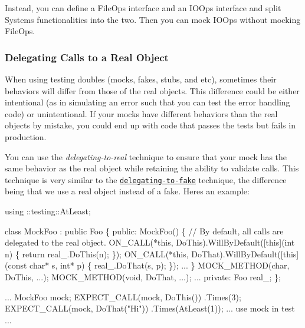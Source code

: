 Instead, you can define a {\ttfamily File\+Ops} interface and an {\ttfamily I\+O\+Ops} interface and split {\ttfamily System}\textquotesingle{}s functionalities into the two. Then you can mock {\ttfamily I\+O\+Ops} without mocking {\ttfamily File\+Ops}.

\subsubsection*{Delegating Calls to a Real Object}

When using testing doubles (mocks, fakes, stubs, and etc), sometimes their behaviors will differ from those of the real objects. This difference could be either intentional (as in simulating an error such that you can test the error handling code) or unintentional. If your mocks have different behaviors than the real objects by mistake, you could end up with code that passes the tests but fails in production.

You can use the {\itshape delegating-\/to-\/real} technique to ensure that your mock has the same behavior as the real object while retaining the ability to validate calls. This technique is very similar to the \href{#DelegatingToFake}{\tt delegating-\/to-\/fake} technique, the difference being that we use a real object instead of a fake. Here\textquotesingle{}s an example\+:


\begin{DoxyCode}
using ::testing::AtLeast;

\textcolor{keyword}{class }MockFoo : \textcolor{keyword}{public} Foo \{
 \textcolor{keyword}{public}:
  MockFoo() \{
    \textcolor{comment}{// By default, all calls are delegated to the real object.}
    ON\_CALL(*\textcolor{keyword}{this}, DoThis).WillByDefault([\textcolor{keyword}{this}](\textcolor{keywordtype}{int} n) \{
      \textcolor{keywordflow}{return} real\_.DoThis(n);
    \});
    ON\_CALL(*\textcolor{keyword}{this}, DoThat).WillByDefault([\textcolor{keyword}{this}](\textcolor{keyword}{const} \textcolor{keywordtype}{char}* s, \textcolor{keywordtype}{int}* p) \{
      real\_.DoThat(s, p);
    \});
    ...
  \}
  MOCK\_METHOD(\textcolor{keywordtype}{char}, DoThis, ...);
  MOCK\_METHOD(\textcolor{keywordtype}{void}, DoThat, ...);
  ...
 \textcolor{keyword}{private}:
  Foo real\_;
\};

...
  MockFoo mock;
  EXPECT\_CALL(mock, DoThis())
      .Times(3);
  EXPECT\_CALL(mock, DoThat(\textcolor{stringliteral}{"Hi"}))
      .Times(AtLeast(1));
  ... use mock in test ...
\end{DoxyCode}


